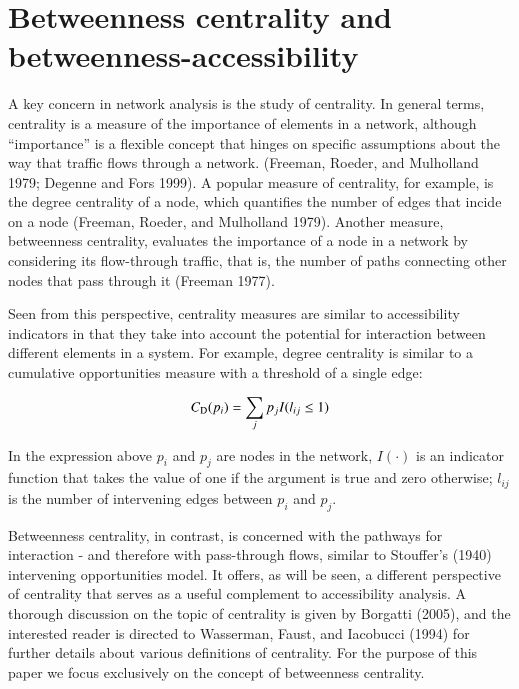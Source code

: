 \documentclass[]{elsarticle} %
\begin{document}
\hypertarget{betweenness-centrality-and-betweenness-accessibility}{%
\section{Betweenness centrality and
betweenness-accessibility}\label{betweenness-centrality-and-betweenness-accessibility}}

A key concern in network analysis is the study of centrality. In general
terms, centrality is a measure of the importance of elements in a
network, although ``importance'' is a flexible concept that hinges on
specific assumptions about the way that traffic flows through a network.
(Freeman, Roeder, and Mulholland 1979; Degenne and Fors 1999). A popular
measure of centrality, for example, is the degree centrality of a node,
which quantifies the number of edges that incide on a node (Freeman,
Roeder, and Mulholland 1979). Another measure, betweenness centrality,
evaluates the importance of a node in a network by considering its
flow-through traffic, that is, the number of paths connecting other
nodes that pass through it (Freeman 1977).

Seen from this perspective, centrality measures are similar to
accessibility indicators in that they take into account the potential
for interaction between different elements in a system. For example,
degree centrality is similar to a cumulative opportunities measure with
a threshold of a single edge:

\begin{equation}\label{f:degree}
C_{\rm D}(p_i) = \sum_j p_jI(l_{ij}\le 1)
\end{equation}

In the expression above \(p_i\) and \(p_j\) are nodes in the network,
\(I(\cdot)\) is an indicator function that takes the value of one if the
argument is true and zero otherwise; \(l_{ij}\) is the number of
intervening edges between \(p_i\) and \(p_j\).

Betweenness centrality, in contrast, is concerned with the pathways for
interaction - and therefore with pass-through flows, similar to
Stouffer's (1940) intervening opportunities model. It offers, as will be
seen, a different perspective of centrality that serves as a useful
complement to accessibility analysis. A thorough discussion on the topic
of centrality is given by Borgatti (2005), and the interested reader is
directed to Wasserman, Faust, and Iacobucci (1994) for further details
about various definitions of centrality. For the purpose of this paper
we focus exclusively on the concept of betweenness centrality.
\end{document}
